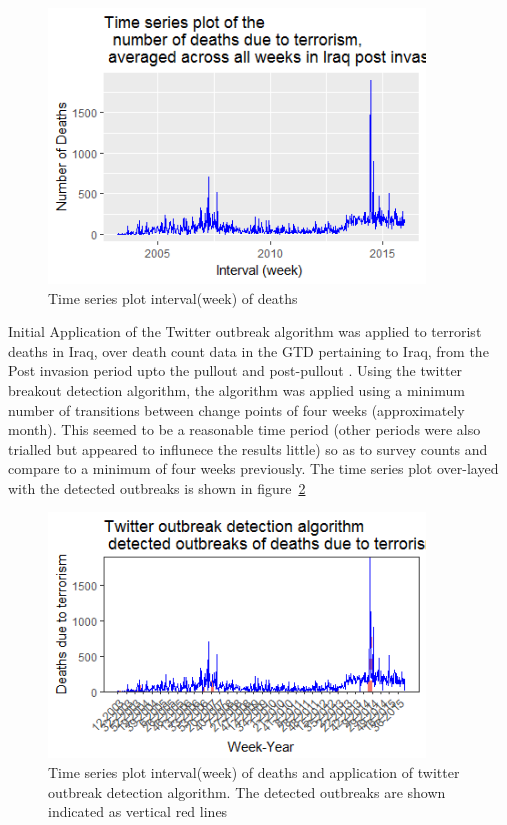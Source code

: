 \begin{figure}[t]
\includegraphics[width=10cm]{Peters_experiment_markdown_files/figure-latex/Rplot03_weekly_death_counts_iraq.png}
\caption{Time series plot interval(week) of deaths}
\label{fig:tseriesweek}
\centering
\end{figure}

Initial Application of the Twitter outbreak algorithm was applied to terrorist deaths in Iraq, over death count data in the GTD pertaining to Iraq, from the Post invasion period upto the pullout and post-pullout . Using the twitter breakout detection algorithm, the algorithm was applied using a minimum number of transitions between change points of four weeks (approximately month). This seemed to be a reasonable time period (other periods were also trialled but appeared to influnece the results little) so as to survey counts and compare to a minimum of four weeks previously. The time series plot over-layed with the detected outbreaks is shown in figure~\ref{fig:tseriesweektwitter outbreak} 

\begin{figure}[t]
\includegraphics[width=10cm]{Peters_experiment_markdown_files/figure-latex/Rplot02_Twitter_outbreak_detection_algo.png}
\caption{Time series plot interval(week) of deaths and application of twitter outbreak detection algorithm. The detected outbreaks are shown indicated as vertical red lines}
\label{fig:tseriesweektwitter outbreak}
\centering
\end{figure}

